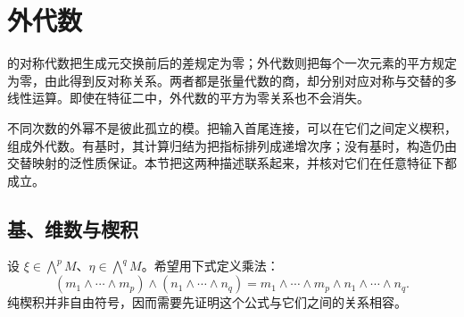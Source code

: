 
\section{外代数}
\label{b2:sec:0902}

的对称代数把生成元交换前后的差规定为零；外代数则把每个一次元素的平方规定为零，由此得到反对称关系。两者都是张量代数的商，却分别对应对称与交替的多线性运算。即使在特征二中，外代数的平方为零关系也不会消失。

\ProseParagraphBreak
不同次数的外幂不是彼此孤立的模。把输入首尾连接，可以在它们之间定义楔积，组成外代数。有基时，其计算归结为把指标排列成递增次序；没有基时，构造仍由交替映射的泛性质保证。本节把这两种描述联系起来，并核对它们在任意特征下都成立。

%
%

\subsection{基、维数与楔积}
\label{b2:subsec:0902:01}

设 \(\xi\in\bigwedge^pM\)、\(\eta\in\bigwedge^qM\)。希望用下式定义乘法：
\[
	(m_1\wedge\cdots\wedge m_p)\wedge(n_1\wedge\cdots\wedge n_q) =m_1\wedge\cdots\wedge m_p\wedge n_1\wedge\cdots\wedge n_q.
\]
纯楔积并非自由符号，因而需要先证明这个公式与它们之间的关系相容。

